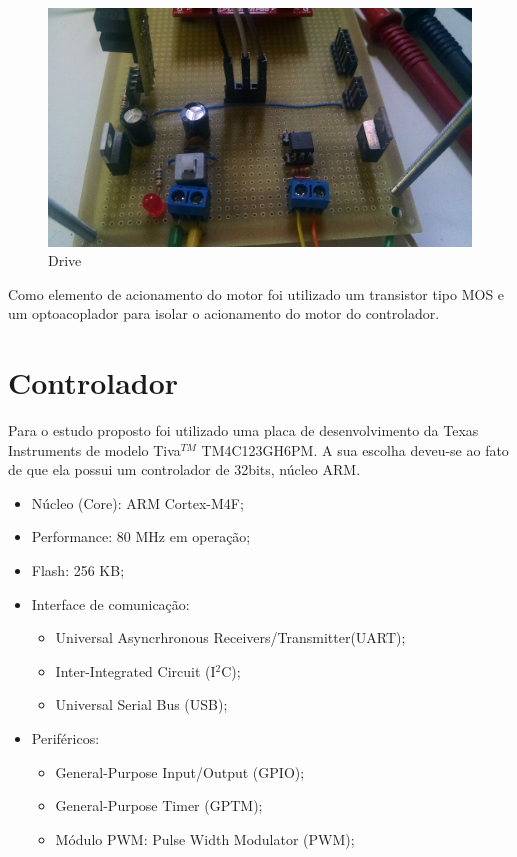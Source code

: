 \begin{figure}[!htb]
\center\includegraphics[scale=0.1, angle=0, clip=true, trim=0 0 0 0]{./imagens/drive.jpg}
\caption{Drive}
\label{fig:drive}
\end{figure}

Como elemento de acionamento do motor foi utilizado um transistor tipo MOS e um optoacoplador para isolar o acionamento do motor do controlador.

\section{Controlador}

Para o estudo proposto foi utilizado uma placa de desenvolvimento da Texas Instruments de modelo Tiva$^{TM}$ TM4C123GH6PM. A sua escolha deveu-se ao fato de que ela possui um controlador de 32bits, núcleo ARM.

\begin{itemize}
\item Núcleo (Core): ARM Cortex-M4F;
\item Performance: 80 MHz em operação;
\item Flash: 256 KB;
\item Interface de comunicação:
	\begin{itemize}
	\item  Universal Asyncrhronous Receivers/Transmitter(UART);
  	\item Inter-Integrated Circuit (I$^2$C);
	\item Universal Serial Bus (USB);
	\end{itemize}
\item Periféricos:
	\begin{itemize}
	\item General-Purpose Input/Output (GPIO);
	\item General-Purpose Timer (GPTM);
	\item Módulo PWM: Pulse Width Modulator (PWM);
	\end{itemize}
\end{itemize}


